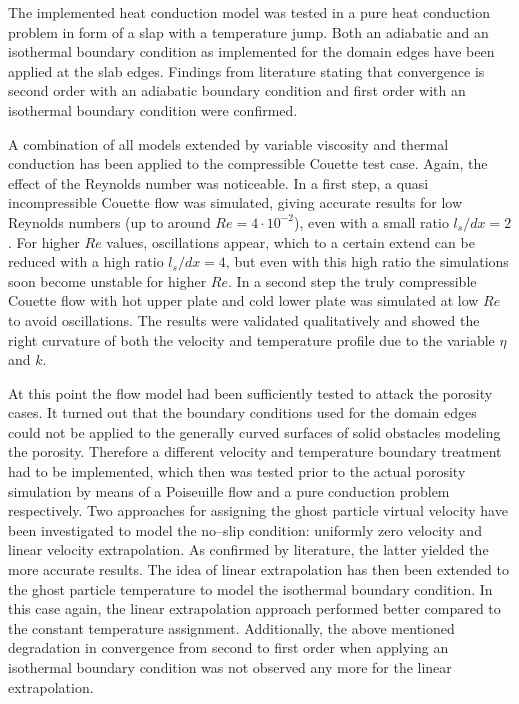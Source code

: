 \documentclass{report}
\begin{document}
The implemented heat conduction model was tested in a pure heat conduction problem in form of a slap with a temperature jump. Both an adiabatic and an isothermal boundary condition as implemented for the domain edges have been applied at the slab edges.
Findings from literature stating that convergence is second order with an adiabatic boundary condition and first order with an isothermal boundary condition were confirmed.

A combination of all models extended by variable viscosity and thermal conduction has been applied to the compressible Couette test case. Again, the effect of the Reynolds number was noticeable. In a first step, a quasi incompressible Couette flow was simulated, giving accurate results for low Reynolds numbers (up to around $Re=4\cdot10^{-2}$), even with a small ratio $l_s/dx=2$. For higher $Re$ values, oscillations appear, which to a certain extend can be reduced with a high ratio $l_s/dx=4$, but even with this high ratio the simulations soon become unstable for higher $Re$. In a second step the truly compressible Couette flow with hot upper plate and cold lower plate was simulated at low $Re$ to avoid oscillations. The results were validated qualitatively and showed the right curvature of both the velocity and temperature profile due to the variable $\eta$ and $k$.

At this point the flow model had been sufficiently tested to attack the porosity cases. It turned out that the boundary conditions used for the domain edges could not be applied to the generally curved surfaces of solid obstacles modeling the porosity. Therefore a different velocity and temperature boundary treatment had to be implemented,  which then was tested prior to the actual porosity simulation by means of a Poiseuille flow and a pure conduction problem respectively. Two approaches for assigning the ghost particle virtual velocity have been investigated to model the no--slip condition: uniformly zero velocity and linear velocity extrapolation. As confirmed by literature, the latter yielded the more accurate results. The idea of linear extrapolation has then been extended to the ghost particle temperature to model the isothermal boundary condition. In this case again, the linear extrapolation approach performed better compared to the constant temperature assignment. Additionally, the above mentioned degradation in convergence from second to first order when applying an isothermal boundary condition was not observed any more for the linear extrapolation.
\end{document}
